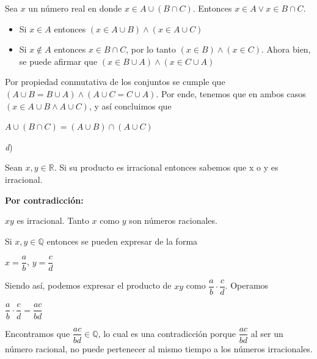 \documentclass[11pt,a4paper]{article}
\begin{document}
\begin{enumerate}
\vspace{0.3cm}

Sea $x$ un número real en donde $x \in A \cup (B \cap C)$. Entonces $x \in A  \vee  x \in B \cap C.$ 

\begin{itemize}
\item Si $x \in A$ entonces $(x \in A \cup B) \wedge (x \in A \cup C)$
\end{itemize}

\begin{itemize}
\item Si $x \notin A$ entonces $x \in B \cap C$, por lo tanto $(x \in B) \wedge (x \in C)$. Ahora bien, se puede afirmar que $(x \in B \cup A) \wedge (x \in C \cup A)$
\end{itemize}

Por propiedad conmutativa de los conjuntos se cumple que $(A \cup B = B \cup A) \wedge (A \cup C = C \cup A)$. Por ende, tenemos que en ambos casos $(x \in A \cup B \wedge A \cup C)$, y así concluimos que

\begin{center}
    $A \cup (B \cap C) = (A \cup B) \cap (A \cup C)$
\end{center}

\textit{d}) 

Sean $x, y \in \mathbb{R}$. Si su producto es irracional entonces sabemos que x o y es irracional.

\textbf{Por contradicción:} 

$xy$ es irracional. Tanto $x$ como $y$ son números racionales. 

Si $x, y \in \mathbb{Q}$ entonces se pueden expresar de la forma

\begin{center}
    $x = \dfrac{a}{b}$, $y = \dfrac{c}{d}
    $
\end{center}

Siendo así, podemos expresar el producto de $xy$ como $\dfrac{a}{b} \cdot \dfrac{c}{d}$. Operamos

\begin{center}

$\dfrac{a}{b} \cdot \dfrac{c}{d} = \dfrac{ac}{bd}$

\end{center}

Encontramos que $\dfrac{ac}{bd} \in \mathbb{Q}$, lo cual es una contradicción porque $\dfrac{ac}{bd}$ al ser un número racional, no puede pertenecer al mismo tiempo a los números irracionales.


\end{enumerate}
\end{document}
